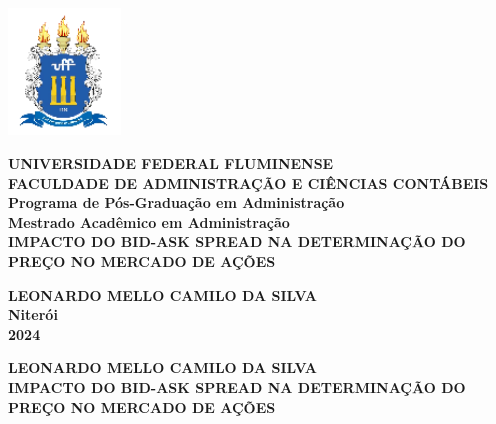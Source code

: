 


\begin{center}
    \includegraphics[angle=0,keepaspectratio,width=3cm]{UFF.png}
    \end{center}
    
    \begin{center}
    \textbf{\fontsize{12}{14}\selectfont 
    UNIVERSIDADE FEDERAL FLUMINENSE\\[0.2cm]
    FACULDADE DE ADMINISTRAÇÃO E CIÊNCIAS CONTÁBEIS\\[0.2cm]
    Programa de Pós-Graduação em Administração\\[0.2cm]
    Mestrado Acadêmico em Administração\\[4.5cm]
    IMPACTO DO BID-ASK SPREAD NA DETERMINAÇÃO DO PREÇO NO MERCADO DE AÇÕES\\[4cm]
    }
    \end{center}
    
    \begin{center}
    \textbf{LEONARDO MELLO CAMILO DA SILVA\\[5.5cm]
    Niterói\\[0.2cm]
    2024
    }
    \end{center}
    \thispagestyle{empty}
    \begin{center}
    
    \textbf{LEONARDO MELLO CAMILO DA SILVA\\[1.5cm]
            IMPACTO DO BID-ASK SPREAD NA DETERMINAÇÃO DO PREÇO NO MERCADO DE AÇÕES\\[5cm]
            }
        
       
        
        \end{center}
    
    
    \begin{quotation}
    \setlength{\leftskip}{7cm}
    \end{quotation}
    

